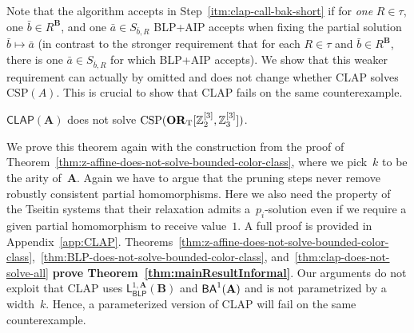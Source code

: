 \documentclass[a4paper,english, thm-restate]{lipics-v2021}
\newcommand{\tup}[1]{\bar{#1}}
\newcommand{\sig}{\tau}
\newcommand{\StructA}{\mathbf{A}}
\newcommand{\StructB}{\mathbf{B}}
\newcommand{\CSP}[1]{\mathrm{CSP}(#1)}
\newcommand{\leqs}{\mathsf{L}}
\newcommand{\blk}[3]{\leqs^{#1,#2}_{\mathsf{BLP}} (#3)}
\newcommand{\CLAP}[1]{\mathsf{CLAP}(#1)}
\begin{document}
	\noindent Note that the algorithm accepts in Step~\ref{itm:clap-call-bak-short}
	if for \emph{one} $R \in \sig$, one $\tup{b} \in R^\StructB$, and one $\tup{a} \in S_{\tup{b},R}$ BLP+AIP accepts when fixing the partial solution $\tup{b} \mapsto \tup{a}$ (in contrast to the stronger requirement that for each  $R \in \sig$ and $\tup{b} \in R^\StructB$, there is one $\tup{a} \in S_{\tup{b},R}$ for which BLP+AIP accepts).
	We show that this weaker requirement can actually by omitted and
	does not change whether CLAP solves $\CSP{A}$.
	This is crucial to show that CLAP fails on the same counterexample.
	
	\begin{theorem}[restate=clapDoesNotSolveAll, name = ]
		\label{thm:clap-does-not-solve-all}
		$\CLAP{\StructA}$ does not solve $\CSP{\ZtwoOrThreeInst}$.
	\end{theorem}
	\noindent We prove this theorem again with the construction from the proof of Theorem~\ref{thm:z-affine-does-not-solve-bounded-color-class},
	where we pick~$k$ to be the arity of~$\StructA$.
	Again we have to argue that the pruning steps never remove robustly consistent partial homomorphisms.
	Here we also need the property of the Tseitin systems that their relaxation admits a~$p_i$-solution even if we require a given partial homomorphism to receive value~$1$.
	A full proof is provided in Appendix~\ref{app:CLAP}.
	Theorems~\ref{thm:z-affine-does-not-solve-bounded-color-class},~\ref{thm:BLP-does-not-solve-bounded-color-class}, and~\ref{thm:clap-does-not-solve-all}
	\textbf{prove Theorem~\ref{thm:mainResultInformal}}.
	Our arguments do not exploit that CLAP uses $\blk{1}{\StructA}{\StructB}$ and 
	$\BAk{1}{\StructA}$ and is not parametrized by a width~$k$.
	Hence, a parameterized version of CLAP will fail on the same counterexample.
	
	
	
	
	
\end{document}
